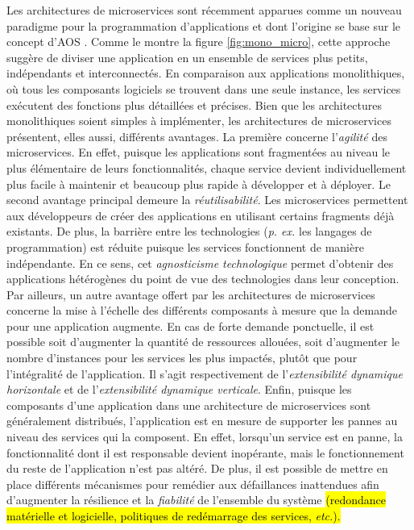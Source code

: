 Les architectures de microservices sont récemment apparues comme un nouveau paradigme pour la programmation d'applications \citep{Dragoni2017} et dont l'origine se base sur le concept d'\ac{AOS} \citep{MacKenzie2006}. Comme le montre la figure \ref{fig:mono_micro}, cette approche suggère de diviser une application en un ensemble de services plus petits, indépendants et interconnectés. En comparaison aux applications monolithiques, où tous les composants logiciels se trouvent dans une seule instance, les services exécutent des fonctions plus détaillées et précises. Bien que les architectures monolithiques soient simples à implémenter, les architectures de microservices présentent, elles aussi, différents avantages. La première concerne l'\emph{agilité} des microservices. En effet, puisque les applications sont fragmentées au niveau le plus élémentaire de leurs fonctionnalités, chaque service devient individuellement plus facile à maintenir et beaucoup plus rapide à développer et à déployer. Le second avantage principal demeure la \emph{réutilisabilité}. Les microservices permettent aux développeurs de créer des applications en utilisant certains fragments déjà existants. De plus, la barrière entre les technologies (\textit{p. ex.} les langages de programmation) est réduite puisque les services fonctionnent de manière indépendante. En ce sens, cet \emph{agnosticisme technologique} permet d'obtenir des applications hétérogènes du point de vue des technologies dans leur conception. Par ailleurs, un autre avantage offert par les architectures de microservices concerne la mise à l'échelle des différents composants à mesure que la demande pour une application augmente. En cas de forte demande ponctuelle, il est possible soit d'augmenter la quantité de ressources allouées, soit d'augmenter le nombre d'instances pour les services les plus impactés, plutôt que pour l'intégralité de l'application. Il s'agit respectivement de l'\emph{extensibilité dynamique horizontale} et de l'\emph{extensibilité dynamique verticale}. Enfin, puisque les composants d'une application dans une architecture de microservices sont généralement distribués, l'application est en mesure de supporter les pannes au niveau des services qui la composent. En effet, lorsqu'un service est en panne, la fonctionnalité dont il est responsable devient inopérante, mais le fonctionnement du reste de l'application n'est pas altéré. De plus, il est possible de mettre en place différents mécanismes pour remédier aux défaillances inattendues afin d'augmenter la résilience et la \emph{fiabilité} de l'ensemble du système \hl{(redondance matérielle et logicielle, politiques de redémarrage des services, \textit{etc.}).}

